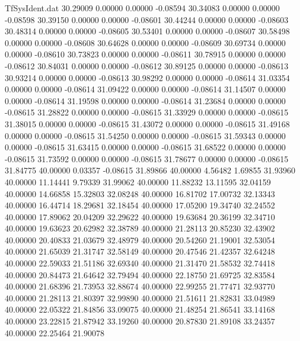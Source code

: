 \begin{filecontents}{TfSysIdent.dat}
  30.29009    0.00000    0.00000   -0.08594
  30.34083    0.00000    0.00000   -0.08598
  30.39150    0.00000    0.00000   -0.08601
  30.44244    0.00000    0.00000   -0.08603
  30.48314    0.00000    0.00000   -0.08605
  30.53401    0.00000    0.00000   -0.08607
  30.58498    0.00000    0.00000   -0.08608
  30.64628    0.00000    0.00000   -0.08609
  30.69734    0.00000    0.00000   -0.08610
  30.73823    0.00000    0.00000   -0.08611
  30.78915    0.00000    0.00000   -0.08612
  30.84031    0.00000    0.00000   -0.08612
  30.89125    0.00000    0.00000   -0.08613
  30.93214    0.00000    0.00000   -0.08613
  30.98292    0.00000    0.00000   -0.08614
  31.03354    0.00000    0.00000   -0.08614
  31.09422    0.00000    0.00000   -0.08614
  31.14507    0.00000    0.00000   -0.08614
  31.19598    0.00000    0.00000   -0.08614
  31.23684    0.00000    0.00000   -0.08615
  31.28822    0.00000    0.00000   -0.08615
  31.33929    0.00000    0.00000   -0.08615
  31.38015    0.00000    0.00000   -0.08615
  31.43072    0.00000    0.00000   -0.08615
  31.49168    0.00000    0.00000   -0.08615
  31.54250    0.00000    0.00000   -0.08615
  31.59343    0.00000    0.00000   -0.08615
  31.63415    0.00000    0.00000   -0.08615
  31.68522    0.00000    0.00000   -0.08615
  31.73592    0.00000    0.00000   -0.08615
  31.78677    0.00000    0.00000   -0.08615
  31.84775   40.00000    0.03357   -0.08615
  31.89866   40.00000    4.56482    1.69855
  31.93960   40.00000   11.14441    9.79339
  31.99062   40.00000   11.88232   13.11595
  32.04159   40.00000   14.66858   15.32803
  32.08248   40.00000   16.81702   17.00732
  32.13343   40.00000   16.44714   18.29681
  32.18454   40.00000   17.05200   19.34740
  32.24552   40.00000   17.89062   20.04209
  32.29622   40.00000   19.63684   20.36199
  32.34710   40.00000   19.63623   20.62982
  32.38789   40.00000   21.28113   20.85230
  32.43902   40.00000   20.40833   21.03679
  32.48979   40.00000   20.54260   21.19001
  32.53054   40.00000   21.65039   21.31747
  32.58149   40.00000   20.47546   21.42357
  32.64248   40.00000   22.59033   21.51186
  32.69340   40.00000   21.31470   21.58532
  32.74418   40.00000   20.84473   21.64642
  32.79494   40.00000   22.18750   21.69725
  32.83584   40.00000   21.68396   21.73953
  32.88674   40.00000   22.99255   21.77471
  32.93770   40.00000   21.28113   21.80397
  32.99890   40.00000   21.51611   21.82831
  33.04989   40.00000   22.05322   21.84856
  33.09075   40.00000   21.48254   21.86541
  33.14168   40.00000   23.22815   21.87942
  33.19260   40.00000   20.87830   21.89108
  33.24357   40.00000   22.25464   21.90078

\end{filecontents}
